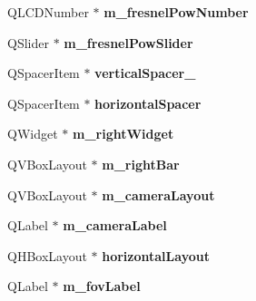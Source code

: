 \begin{DoxyCompactItemize}
\item 
\hypertarget{classUi__MainWindow_a6b2d882c64d96ac26988f32b894014fd}{Q\-L\-C\-D\-Number $\ast$ {\bfseries m\-\_\-fresnel\-Pow\-Number}}\label{classUi__MainWindow_a6b2d882c64d96ac26988f32b894014fd}

\item 
\hypertarget{classUi__MainWindow_aedf6628fb3fe51184fb9cc01b3671d20}{Q\-Slider $\ast$ {\bfseries m\-\_\-fresnel\-Pow\-Slider}}\label{classUi__MainWindow_aedf6628fb3fe51184fb9cc01b3671d20}

\item 
\hypertarget{classUi__MainWindow_ac845bdf6b5b5237378a7b067808b7a31}{Q\-Spacer\-Item $\ast$ {\bfseries vertical\-Spacer\-\_}}\label{classUi__MainWindow_ac845bdf6b5b5237378a7b067808b7a31}

\item 
\hypertarget{classUi__MainWindow_a7871ea8c4b6c595d7ccd53960b344719}{Q\-Spacer\-Item $\ast$ {\bfseries horizontal\-Spacer}}\label{classUi__MainWindow_a7871ea8c4b6c595d7ccd53960b344719}

\item 
\hypertarget{classUi__MainWindow_a9735695847b7e1faf51541b1ea1f97b8}{Q\-Widget $\ast$ {\bfseries m\-\_\-right\-Widget}}\label{classUi__MainWindow_a9735695847b7e1faf51541b1ea1f97b8}

\item 
\hypertarget{classUi__MainWindow_a0c9dd11670131f7b4ec83d375377f55e}{Q\-V\-Box\-Layout $\ast$ {\bfseries m\-\_\-right\-Bar}}\label{classUi__MainWindow_a0c9dd11670131f7b4ec83d375377f55e}

\item 
\hypertarget{classUi__MainWindow_aecc1c83b9a401c7853978e70a97c71e4}{Q\-V\-Box\-Layout $\ast$ {\bfseries m\-\_\-camera\-Layout}}\label{classUi__MainWindow_aecc1c83b9a401c7853978e70a97c71e4}

\item 
\hypertarget{classUi__MainWindow_a3ec0b70cb1537beb4d636da2e5752085}{Q\-Label $\ast$ {\bfseries m\-\_\-camera\-Label}}\label{classUi__MainWindow_a3ec0b70cb1537beb4d636da2e5752085}

\item 
\hypertarget{classUi__MainWindow_acd6fdc9ebacc4b25b834162380d75ce8}{Q\-H\-Box\-Layout $\ast$ {\bfseries horizontal\-Layout}}\label{classUi__MainWindow_acd6fdc9ebacc4b25b834162380d75ce8}

\item 
\hypertarget{classUi__MainWindow_a1cb8bb49dfbf231887a3cc41d00c673f}{Q\-Label $\ast$ {\bfseries m\-\_\-fov\-Label}}\label{classUi__MainWindow_a1cb8bb49dfbf231887a3cc41d00c673f}


\end{DoxyCompactItemize}
